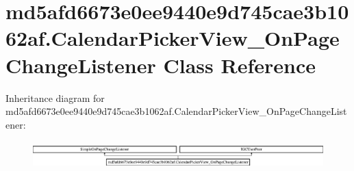 \hypertarget{classmd5afd6673e0ee9440e9d745cae3b1062af_1_1CalendarPickerView__OnPageChangeListener}{}\section{md5afd6673e0ee9440e9d745cae3b1062af.\+Calendar\+Picker\+View\+\_\+\+On\+Page\+Change\+Listener Class Reference}
\label{classmd5afd6673e0ee9440e9d745cae3b1062af_1_1CalendarPickerView__OnPageChangeListener}
Inheritance diagram for md5afd6673e0ee9440e9d745cae3b1062af.\+Calendar\+Picker\+View\+\_\+\+On\+Page\+Change\+Listener\+:\begin{figure}[H]
\begin{center}
\leavevmode
\includegraphics[height=1.070746cm]{classmd5afd6673e0ee9440e9d745cae3b1062af_1_1CalendarPickerView__OnPageChangeListener}
\end{center}
\end{figure}
